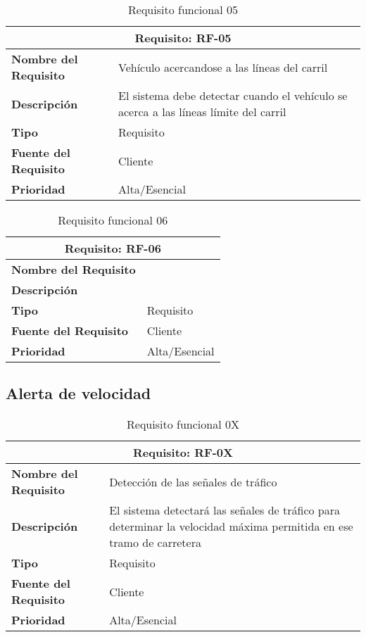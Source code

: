 \documentclass[10pt,a4paper,oldfontcommands]{dpds}
\begin{document}
\begin{table}[h]
\begin{center}
\begin{tabular}{p{} p{7cm}}
\multicolumn{2}{c}{\textbf{Requisito: RF-05} } \\
\hline \hline
\textbf{Nombre del Requisito} & Vehículo acercandose a las líneas del carril \\
\textbf{Descripción} & El sistema debe detectar cuando el vehículo se acerca a las líneas límite del carril \\
\textbf{Tipo} & Requisito  \\
\textbf{Fuente del Requisito} & Cliente  \\
\textbf{Prioridad} & Alta/Esencial  \\ \hline
\end{tabular}
\caption{Requisito funcional 05}
\label{tab:personal}
\end{center}
\end{table}

\begin{table}[h]
\begin{center}
\begin{tabular}{p{} p{7cm}}
\multicolumn{2}{c}{\textbf{Requisito: RF-06} } \\
\hline \hline
\textbf{Nombre del Requisito} &  \\
\textbf{Descripción} &  \\
\textbf{Tipo} & Requisito  \\
\textbf{Fuente del Requisito} & Cliente  \\
\textbf{Prioridad} & Alta/Esencial  \\ \hline
\end{tabular}
\caption{Requisito funcional 06}
\label{tab:personal}
\end{center}
\end{table}

\subsection{Alerta de velocidad}

\begin{table}[h]
\begin{center}
\begin{tabular}{p{} p{7cm}}
\multicolumn{2}{c}{\textbf{Requisito: RF-0X} } \\
\hline \hline
\textbf{Nombre del Requisito} & Detección de las señales de tráfico \\
\textbf{Descripción} & El sistema detectará las señales de tráfico para determinar la velocidad máxima permitida en ese tramo de carretera \\
\textbf{Tipo} & Requisito  \\
\textbf{Fuente del Requisito} & Cliente  \\
\textbf{Prioridad} & Alta/Esencial  \\ \hline
\end{tabular}
\caption{Requisito funcional 0X}
\label{tab:personal}
\end{center}
\end{table}
\end{document}
